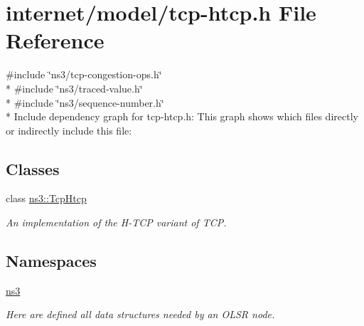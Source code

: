 \hypertarget{tcp-htcp_8h}{}\section{internet/model/tcp-\/htcp.h File Reference}
\label{tcp-htcp_8h}
{\ttfamily \#include \char`\"{}ns3/tcp-\/congestion-\/ops.\+h\char`\"{}}\\*
{\ttfamily \#include \char`\"{}ns3/traced-\/value.\+h\char`\"{}}\\*
{\ttfamily \#include \char`\"{}ns3/sequence-\/number.\+h\char`\"{}}\\*
Include dependency graph for tcp-\/htcp.h\+:
This graph shows which files directly or indirectly include this file\+:
\subsection*{Classes}
\begin{DoxyCompactItemize}
\item 
class \hyperlink{classns3_1_1TcpHtcp}{ns3\+::\+Tcp\+Htcp}
\begin{DoxyCompactList}\small\item\em An implementation of the H-\/\+T\+CP variant of T\+CP. \end{DoxyCompactList}\end{DoxyCompactItemize}
\subsection*{Namespaces}
\begin{DoxyCompactItemize}
\item 
 \hyperlink{namespacens3}{ns3}
\begin{DoxyCompactList}\small\item\em Here are defined all data structures needed by an O\+L\+SR node. \end{DoxyCompactList}\end{DoxyCompactItemize}

